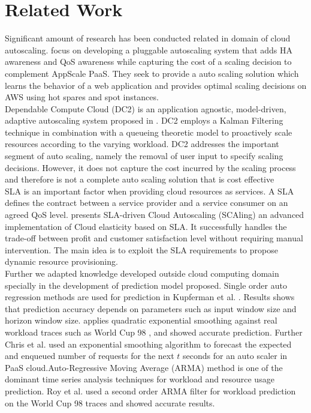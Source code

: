 \section{Related Work}
Significant amount of research has been conducted related in domain of cloud autoscaling. 
\cite{pluggable} focus on developing a pluggable autoscaling system that adds HA awareness and QoS awareness while capturing the cost of a scaling decision to complement AppScale PaaS. They seek to provide a auto scaling solution which learns the behavior of a web application and provides optimal scaling decisions on AWS using hot spares and spot instances.\\

Dependable Compute Cloud (DC2) is an application agnostic, model-driven, adaptive autoscaling system proposed in \cite{modeldriven}. DC2 employs a Kalman Filtering technique in combination with a queueing theoretic model to proactively scale resources according to the varying workload. DC2 addresses the important segment of auto scaling, namely the removal of user input to specify scaling decisions. However, it does not capture the cost incurred by the scaling process and therefore is not a complete auto scaling solution that is cost effective\\

SLA is an important factor when providing cloud resources as services. A SLA defines the contract between a service provider and a service consumer on an agreed QoS level. \cite{sladriven} presents SLA-driven Cloud Autoscaling (SCAling) an advanced implementation of Cloud elasticity based on SLA. It successfully handles the trade-off between profit and customer satisfaction level without requiring manual intervention. The main idea is to exploit the SLA requirements to propose dynamic resource provisioning.\\

Further we adapted knowledge developed outside cloud computing domain specially in the development of prediction model proposed. Single order auto regression methods are used for prediction in Kupferman et al. \cite{Kupferman_2009}. Results shows that prediction accuracy depends on parameters such as input window size and horizon window size. \cite{Mi_2010} applies quadratic exponential smoothing against real workload traces such as World Cup 98 \cite{WorldCup_1998}, and showed accurate prediction. Further Chris et al. used an exponential smoothing algorithm to forecast the expected and enqueued number of requests  for the next $t$ seconds \cite{Bunch_2012} for an auto scaler in PaaS cloud.Auto-Regressive Moving Average (ARMA) method is one of the dominant time series analysis techniques for workload and resource usage prediction. Roy et al. \cite{Roy_2011} used a second order ARMA filter for workload prediction on the World Cup 98 traces and showed accurate results.\\

